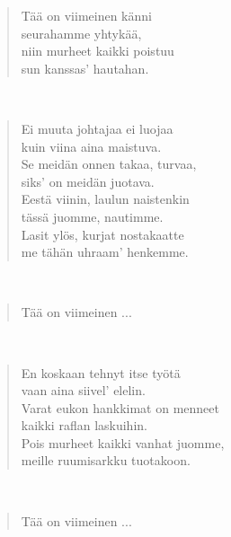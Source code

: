 \noindent\begin{minipage}{\linewidth}
\begin{verse}
	Tää on viimeinen känni\\
	seurahamme yhtykää,\\
	niin murheet kaikki poistuu\\
	sun kanssas' hautahan.\\
\end{verse}
\end{minipage}\\[10pt]
\noindent\begin{minipage}{\linewidth}
\begin{verse}
	Ei muuta johtajaa ei luojaa\\
	kuin viina aina maistuva.\\
	Se meidän onnen takaa, turvaa,\\
	siks' on meidän juotava.\\
	Eestä viinin, laulun naistenkin\\
	tässä juomme, nautimme.\\
	Lasit ylös, kurjat nostakaatte\\
	me tähän uhraam' henkemme.\\
\end{verse}
\end{minipage}\\[10pt]
\noindent\begin{minipage}{\linewidth}
\begin{verse}
	Tää on viimeinen ...\\
\end{verse}
\end{minipage}\\[10pt]
\noindent\begin{minipage}{\linewidth}
\begin{verse}
	En koskaan tehnyt itse työtä\\
	vaan aina siivel' elelin.\\
	Varat eukon hankkimat on menneet\\
	kaikki raflan laskuihin.\\
	Pois murheet kaikki vanhat juomme,\\
	meille ruumisarkku tuotakoon.\\
\end{verse}
\end{minipage}\\[10pt]
\noindent\begin{minipage}{\linewidth}
\begin{verse}
	Tää on viimeinen ...\\
\end{verse}
\end{minipage}\\[10pt]
